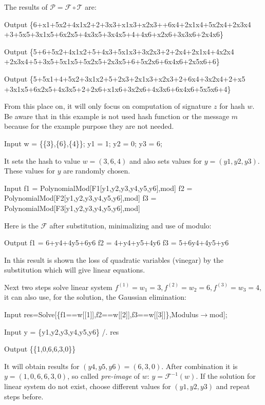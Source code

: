 \documentclass[thesis=M,english]{FITthesis}[2019/12/23]
\begin{document}
\noindent
The results of $\mathcal{P} = \mathcal{F} \circ \mathcal{T}$ are:
\begin{mmaCell}[addtoindex=3,leftmargin=1em]{Output}
\{6+x1+5x2+4x1x2+2+3x3+x1x3+x2x3++6x4+2x1x4+5x2x4+2x3x4
+3+5x5+3x1x5+6x2x5+4x3x5+3x4x5+4+4x6+x2x6+3x3x6+2x4x6\}
\end{mmaCell}
\begin{mmaCell}[leftmargin=1em]{Output}
\{5+6+5x2+4x1x2+5+4x3+5x1x3+3x2x3+2+2x4+2x1x4+4x2x4
+2x3x4+5+3x5+5x1x5+5x2x5+2x3x5+6+5x2x6+6x4x6+2x5x6+6\}
\end{mmaCell}
\begin{mmaCell}[leftmargin=1em]{Output}
\{5+5x1+4+5x2+3x1x2+5+2x3+2x1x3+x2x3+2+6x4+3x2x4+2+x5
+3x1x5+6x2x5+4x3x5+2+2x6+x1x6+3x2x6+4x3x6+6x4x6+5x5x6+4\}
\end{mmaCell}
From this place on, it will only focus on computation of signature $z$ for hash $w$. Be aware that in this example is not used hash function or the message $m$ because for the example purpose they are not needed.
\begin{mmaCell}[moredefined={w, y1, y2, y3}]{Input}
  w  = \{\{3\},\{6\},\{4\}\};
  y1 = 1;
  y2 = 0;
  y3 = 6;
\end{mmaCell}
It sets the hash to value $w = (3,6,4)$ and also sets values for $y = (y1,y2,y3)$. These values for $y$ are randomly chosen.
\begin{mmaCell}[addtoindex=3,moredefined={f1, F1, y1, y2, y3, mod, f2, F2, f3, F3}]{Input}
  f1 = PolynomialMod[F1[y1,y2,y3,y4,y5,y6],mod]
  f2 = PolynomialMod[F2[y1,y2,y3,y4,y5,y6],mod]
  f3 = PolynomialMod[F3[y1,y2,y3,y4,y5,y6],mod]
\end{mmaCell}
Here is the $\mathcal{F}$ after substitution, minimalizing and use of modulo:
\begin{mmaCell}{Output}
  f1 = 6+y4+4y5+6y6
  f2 = 4+y4+y5+4y6
  f3 = 5+6y4+4y5+y6
\end{mmaCell}
In this result is shown the loss of quadratic variables (vinegar) by the substitution which will give linear equations.

\bigskip
\noindent
Next two steps solve linear system $f^{(1)} = w_1 = 3, f^{(2)} = w_2 = 6, f^{(3)} = w_3 = 4$, it can also use, for the solution, the Gaussian elimination:
\begin{mmaCell}[moredefined={res, f1, w, f2, f3, mod}]{Input}
  res=Solve[\{f1==w[[1]],f2==w[[2]],f3==w[[3]]\},Modulus\(\pmb{\to}\)mod];
\end{mmaCell}
\begin{mmaCell}[moredefined={y, y1, y2, y3, res}]{Input}
  y = \{y1,y2,y3,y4,y5,y6\} /. res 
\end{mmaCell}
\begin{mmaCell}{Output}
  \{\{1,0,6,6,3,0\}\}
\end{mmaCell}
It will obtain results for $(y4,y5,y6) = (6,3,0)$. After combination it is $y = (1,0,6,6,3,0)$, so called \textit{pre-image} of $w$: $y =  \mathcal{F}^{-1}(w)$. If the solution for linear system do not exist, choose different values for $(y1,y2,y3)$ and repeat steps before.
\end{document}
